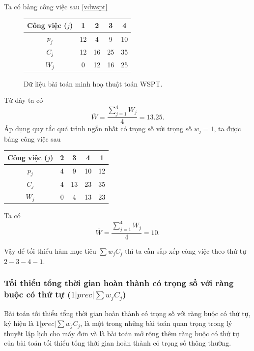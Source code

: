 \begin{vd}
Ta có bảng công việc sau \eqref{vdwspt}

\begin{figure}[h!]
	\centering
	\begin{tabular}{|c | c c c c |} 
	\hline
	Công việc ($j$) & 1 & 2 & 3 & 4 \\
	\hline\hline
	$p_j$ & 12 & 4 & 9 & 10 \\
	$C_j$ & 12 & 16 & 25 & 35 \\
	$W_j$ & 0 & 12 & 16 & 25 \\
	\hline
	\end{tabular}
\caption{\label{vdwspt} Dữ liệu bài toán minh hoạ thuật toán WSPT.}
\end{figure}

Từ đây ta có
\begin{equation*}
\overline{W}=\frac{\sum_{j=1}^{4}W_j}{4} = 13.25.
\end{equation*}
Áp dụng quy tắc quá trình ngắn nhất có trọng số với trọng số $w_j=1$, ta được bảng công việc sau
\begin{table}[h!]
	\centering
	\begin{tabular}{|c | c c c c |} 
	\hline
	Công việc ($j$) & 2 & 3 & 4 & 1 \\
	\hline\hline
	$p_j$ & 4 & 9 & 10 & 12 \\
	$C_j$ & 4 & 13 & 23 & 35 \\
	$W_j$ & 0 & 4 & 13 & 23 \\
	\hline
	\end{tabular}
\end{table}

Ta có
\begin{equation*}
\overline{W}=\frac{\sum_{j=1}^{4}W_j}{4} = 10.
\end{equation*}

Vậy để tối thiểu hàm mục tiêu $\sum w_j C_j$ thì ta cần sắp xếp công việc theo thứ tự $2-3-4-1$.
\end{vd}

\subsubsection*{Tối thiểu tổng thời gian hoàn thành có trọng số với ràng buộc có thứ tự ($1 | prec | \sum w_j C_j$)}
Bài toán tối thiểu tổng thời gian hoàn thành có trọng số với ràng buộc có thứ tự, ký hiệu là $1|prec|\sum w_j C_j$, là một trong những bài toán quan trọng trong lý thuyết lập lịch cho máy đơn và là bài toán mở rộng thêm ràng buộc có thứ tự của bài toán tối thiểu tổng thời gian hoàn thành có trọng số thông thường.

